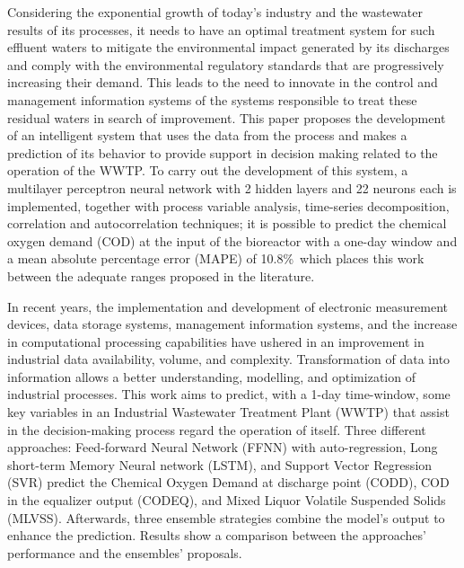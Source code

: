 Considering the exponential growth of today’s industry and the wastewater results of its processes, it needs to have an optimal treatment system for such effluent waters to mitigate the environmental impact generated by its discharges and comply with the environmental regulatory standards that are progressively increasing their demand. This leads to the need to innovate in the control and management information systems of the systems responsible to treat these residual waters in search of improvement. This paper proposes the development of an intelligent system that uses the data from the process and makes a prediction of its behavior to provide support in decision making related to the operation of the \ac{WWTP}. To carry out the development of this system, a multilayer perceptron neural network with 2 hidden layers and 22 neurons each is implemented, together with process variable analysis, time-series decomposition, correlation and autocorrelation techniques; it is possible to predict the chemical oxygen demand (COD) at the input of the bioreactor with a one-day window and a mean absolute percentage error (MAPE) of 10.8\%\, which places this work between the adequate ranges proposed in the literature.
 
 In recent years, the implementation and development of electronic measurement devices, data storage systems, management information systems, and the increase in computational processing capabilities have ushered in an improvement in industrial data availability, volume, and complexity. Transformation of data into information allows a better understanding, modelling, and optimization of industrial processes. This work aims to predict, with a 1-day time-window, some key variables in an Industrial Wastewater Treatment Plant (WWTP) that assist in the decision-making process regard the operation of itself. Three different approaches: Feed-forward Neural Network (FFNN) with auto-regression, Long short-term Memory Neural network (LSTM), and Support Vector Regression (SVR) predict the Chemical Oxygen Demand at discharge point (CODD), COD in the equalizer output (CODEQ), and Mixed Liquor Volatile Suspended Solids (MLVSS). Afterwards, three ensemble strategies combine the model’s output to enhance the prediction. Results show a comparison between the approaches’ performance and the ensembles’ proposals.


